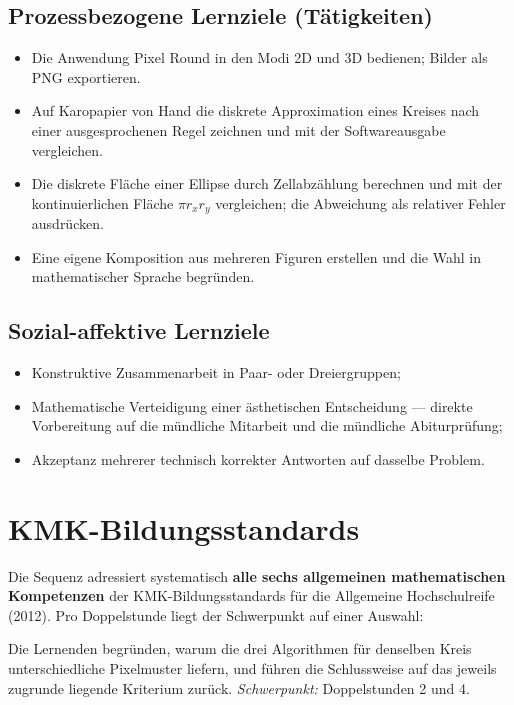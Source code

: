 \documentclass[12pt,a4paper]{scrartcl}
\newcommand{\acc}[1]{\textcolor{accent}{\textbf{#1}}}
\begin{document}
\subsection{Prozessbezogene Lernziele (Tätigkeiten)}

\begin{itemize}[leftmargin=1.3em,itemsep=0.15em,topsep=0.3em]
  \item Die Anwendung Pixel Round in den Modi 2D und 3D bedienen; Bilder als PNG exportieren.
  \item Auf Karopapier von Hand die diskrete Approximation eines Kreises nach einer ausgesprochenen Regel zeichnen und mit der Softwareausgabe vergleichen.
  \item Die diskrete Fläche einer Ellipse durch Zellabzählung berechnen und mit der kontinuierlichen Fläche $\pi r_x r_y$ vergleichen; die Abweichung als relativer Fehler ausdrücken.
  \item Eine eigene Komposition aus mehreren Figuren erstellen und die Wahl in mathematischer Sprache begründen.
\end{itemize}

\subsection{Sozial-affektive Lernziele}

\begin{itemize}[leftmargin=1.3em,itemsep=0.15em,topsep=0.3em]
  \item Konstruktive Zusammenarbeit in Paar- oder Dreiergruppen;
  \item Mathematische Verteidigung einer ästhetischen Entscheidung --- direkte Vorbereitung auf die mündliche Mitarbeit und die mündliche Abiturprüfung;
  \item Akzeptanz mehrerer technisch korrekter Antworten auf dasselbe Problem.
\end{itemize}

\section{KMK-Bildungsstandards}

Die Sequenz adressiert systematisch \acc{alle sechs allgemeinen mathematischen Kompetenzen} der KMK-Bildungsstandards für die Allgemeine Hochschulreife (2012). Pro Doppelstunde liegt der Schwerpunkt auf einer Auswahl:

\begin{kompetenz}
Die Lernenden begründen, warum die drei Algorithmen für denselben Kreis unterschiedliche Pixelmuster liefern, und führen die Schlussweise auf das jeweils zugrunde liegende Kriterium zurück. \emph{Schwerpunkt:} Doppelstunden 2 und 4.
\end{kompetenz}
\end{document}
